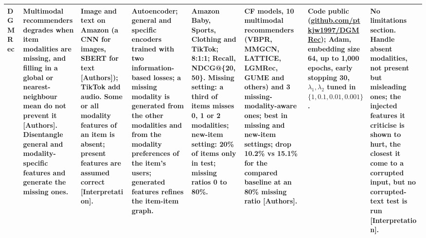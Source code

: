 \documentclass[conference]{IEEEtran}
\begin{document}
\begin{longtable}{@{}p{1.6cm}*{7}{>{\raggedright\arraybackslash}p{2.2cm}}@{}}
\midrule
DGMRec~\cite{kim2025dgmrec} & Multimodal recommenders degrades when item modalities are missing, and filling in a global or nearest-neighbour mean do not prevent it [Authors]. Disentangle general and modality-specific features and generate the missing ones. & Image and text on Amazon (a CNN for images, SBERT for text [Authors]); TikTok add audio. Some or all modality features of an item is absent; present features are assumed correct [Interpretation]. & Autoencoder; general and specific encoders trained with two information-based losses; a missing modality is generated from the other modalities and from the modality preferences of the item's users; generated features refines the item-item graph. & Amazon Baby, Sports, Clothing and TikTok; 8:1:1; Recall, NDCG@\{20,50\}. Missing setting: a third of items misses 0, 1 or 2 modalities; new-item setting: 20\% of items only in test; missing ratios 0 to 80\%. & 5 CF models, 10 multimodal recommenders (VBPR, MMGCN, LATTICE, LGMRec, GUME and others) and 3 missing-modality-aware ones; best in missing and new-item settings; drop 10.2\% vs 15.1\% for the compared baseline at an 80\% missing ratio [Authors]. & Code public (\url{github.com/ptkjw1997/DGMRec}); Adam, embedding size 64, up to 1,000 epochs, early stopping 30, $\lambda_1,\lambda_2$ tuned in $\{1,\allowbreak 0.1,\allowbreak 0.01,\allowbreak 0.001\}$. & No limitations section. Handle absent modalities, not present but misleading ones; the injected features it criticise is shown to hurt, the closest it come to a corrupted input, but no corrupted-text test is run [Interpretation]. \\
\midrule

\end{longtable}
\end{document}
